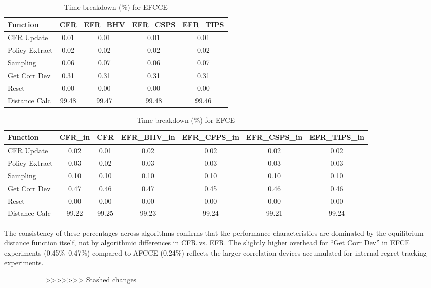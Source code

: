 \documentclass[11pt]{article}
\begin{document}
\begin{table}[H]
\centering
\caption{Time breakdown (\%) for EFCCE}
\label{tab:efcce_breakdown}
\begin{tabular}{lcccc}
\toprule
Function & CFR & EFR\_BHV & EFR\_CSPS & EFR\_TIPS \\
\midrule
CFR Update & 0.01 & 0.01 & 0.01 & 0.01 \\
Policy Extract & 0.02 & 0.02 & 0.02 & 0.02 \\
Sampling & 0.06 & 0.07 & 0.06 & 0.07 \\
Get Corr Dev & 0.31 & 0.31 & 0.31 & 0.31 \\
Reset & 0.00 & 0.00 & 0.00 & 0.00 \\
Distance Calc & 99.48 & 99.47 & 99.48 & 99.46 \\
\bottomrule
\end{tabular}
\end{table}

\begin{table}[H]
\centering
\caption{Time breakdown (\%) for EFCE}
\label{tab:efce_breakdown}
\begin{tabular}{lcccccc}
\toprule
Function & CFR\_in & CFR & EFR\_BHV\_in & EFR\_CFPS\_in & EFR\_CSPS\_in & EFR\_TIPS\_in \\
\midrule
CFR Update & 0.02 & 0.01 & 0.02 & 0.02 & 0.02 & 0.02 \\
Policy Extract & 0.03 & 0.02 & 0.03 & 0.03 & 0.03 & 0.03 \\
Sampling & 0.10 & 0.10 & 0.10 & 0.10 & 0.10 & 0.10 \\
Get Corr Dev & 0.47 & 0.46 & 0.47 & 0.45 & 0.46 & 0.46 \\
Reset & 0.00 & 0.00 & 0.00 & 0.00 & 0.00 & 0.00 \\
Distance Calc & 99.22 & 99.25 & 99.23 & 99.24 & 99.21 & 99.24 \\
\bottomrule
\end{tabular}
\end{table}

The consistency of these percentages across algorithms confirms that the performance characteristics are dominated by the equilibrium distance function itself, not by algorithmic differences in CFR vs. EFR. The slightly higher overhead for ``Get Corr Dev'' in EFCE experiments (0.45\%--0.47\%) compared to AFCCE (0.24\%) reflects the larger correlation devices accumulated for internal-regret tracking experiments.

=======
>>>>>>> Stashed changes
\end{document}
